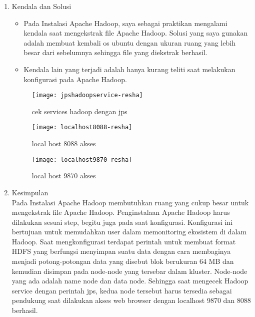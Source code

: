 
\begin{enumerate}
\item Kendala dan Solusi
\begin{itemize}
\item Pada Instalasi Apache Hadoop, saya sebagai praktikan mengalami kendala saat mengekstrak file Apache Hadoop. Solusi yang saya gunakan adalah membuat kembali os ubuntu dengan ukuran ruang yang lebih besar dari sebelumnya sehingga file yang diekstrak berhasil.
\item Kendala lain yang terjadi adalah hanya kurang teliti saat melakukan konfigurasi pada Apache Hadoop.
\end{itemize}

\begin{figure}[!ht]
\texttt{[image: jpshadoopservice-resha]}
\caption{cek services hadoop dengan jps}
\label{gam:perkuliahan-22-09}
\end{figure}

\begin{figure}[!ht]
\texttt{[image: localhost8088-resha]}
\caption{local host 8088 akses}
\label{gam:perkuliahan-22-09}
\end{figure}

\begin{figure}[!ht]
\texttt{[image: localhost9870-resha]}
\caption{local host 9870 akses}
\label{gam:perkuliahan-22-09}
\end{figure}

\item Kesimpulan \\
Pada Instalasi Apache Hadoop membutuhkan ruang yang cukup besar untuk mengekstrak file Apache Hadoop. Penginstalaan Apache Hadoop harus dilakukan sesuai step, begitu juga pada saat konfigurasi. Konfigurasi ini bertujuan untuk memudahkan user dalam memonitoring ekosistem di dalam Hadoop. Saat mengkonfigurasi terdapat perintah untuk membuat format HDFS yang berfungsi menyimpan suatu data dengan cara membaginya menjadi potong-potongan data yang disebut blok berukuran 64 MB dan kemudian disimpan pada node-node yang tersebar dalam kluster. Node-node yang ada adalah name node dan data node. Sehingga saat mengecek Hadoop service dengan perintah jps, kedua node tersebut harus tersedia sebagai pendukung saat dilakukan akses web browser dengan localhost 9870 dan 8088 berhasil.
\end{enumerate}


